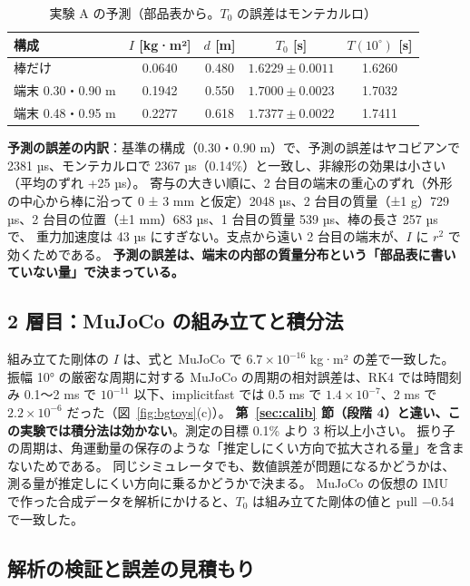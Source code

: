 \documentclass[paper=a4paper,fontsize=10pt,twocolumn,column_gap=2zw,line_length=24zw,number_of_lines=46,head_space=20mm]{jlreq}
\begin{document}
\begin{table}[t]\centering\footnotesize
\caption{実験 A の予測（部品表から。$T_0$ の誤差はモンテカルロ）}\label{tab:bgpred}
\setlength{\tabcolsep}{2.5pt}
\begin{tabular}{lcccc}\toprule
構成 & $I$ [kg·m²] & $d$ [m] & $T_0$ [s] & $T(10^\circ)$ [s] \\\midrule
棒だけ & 0.0640 & 0.480 & $1.6229\pm0.0011$ & 1.6260 \\
端末 0.30・0.90 m & 0.1942 & 0.550 & $1.7000\pm0.0023$ & 1.7032 \\
端末 0.48・0.95 m & 0.2277 & 0.618 & $1.7377\pm0.0022$ & 1.7411 \\\bottomrule
\end{tabular}
\end{table}

\textbf{予測の誤差の内訳}：基準の構成（0.30・0.90 m）で、予測の誤差はヤコビアンで 2381 µs、モンテカルロで 2367 µs（0.14\%）と一致し、非線形の効果は小さい（平均のずれ +25 µs）。
寄与の大きい順に、2 台目の端末の重心のずれ（外形の中心から棒に沿って 0 ± 3 mm と仮定）2048 µs、2 台目の質量（±1 g）729 µs、2 台目の位置（±1 mm）683 µs、1 台目の質量 539 µs、棒の長さ 257 µs で、
重力加速度は 43 µs にすぎない。支点から遠い 2 台目の端末が、$I$ に $r^2$ で効くためである。
\textbf{予測の誤差は、端末の内部の質量分布という「部品表に書いていない量」で決まっている。}

\subsection{2 層目：MuJoCo の組み立てと積分法}

組み立てた剛体の $I$ は、式と MuJoCo で $6.7\times10^{-16}$ kg·m² の差で一致した。
振幅 10° の厳密な周期に対する MuJoCo の周期の相対誤差は、RK4 では時間刻み 0.1〜2 ms で $10^{-11}$ 以下、implicitfast では 0.5 ms で $1.4\times10^{-7}$、2 ms で $2.2\times10^{-6}$ だった（図~\ref{fig:bgtoys}(c)）。
\textbf{第~\ref{sec:calib} 節（段階 4）と違い、この実験では積分法は効かない}。測定の目標 0.1\% より 3 桁以上小さい。
振り子の周期は、角運動量の保存のような「推定しにくい方向で拡大される量」を含まないためである。
同じシミュレータでも、数値誤差が問題になるかどうかは、測る量が推定しにくい方向に乗るかどうかで決まる。
MuJoCo の仮想の IMU で作った合成データを解析にかけると、$T_0$ は組み立てた剛体の値と pull $-0.54$ で一致した。

\subsection{解析の検証と誤差の見積もり}
\end{document}
